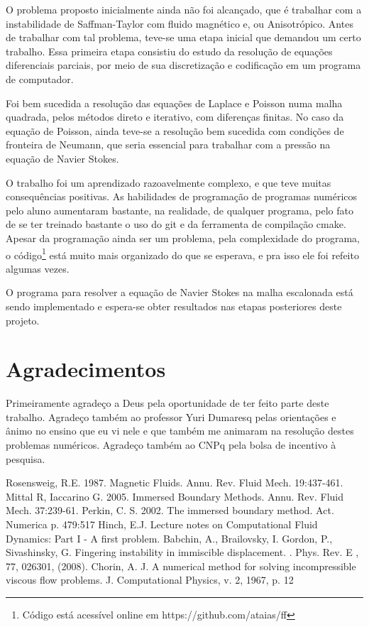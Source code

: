 \documentclass[journal]{IEEEtran}
\begin{document}
O problema proposto inicialmente ainda não foi alcançado, que é trabalhar com a instabilidade de Saffman-Taylor com fluido magnético e, ou Anisotrópico. Antes de trabalhar com tal problema, teve-se uma etapa inicial que demandou um certo trabalho. Essa primeira etapa consistiu do estudo da resolução de equações diferenciais parciais, por meio de sua discretização e codificação em um programa de computador.

Foi bem sucedida a resolução das equações de Laplace e Poisson numa malha quadrada, pelos métodos direto e iterativo, com diferenças finitas. No caso da equação de Poisson, ainda teve-se a resolução bem sucedida com condições de fronteira de Neumann, que seria essencial para trabalhar com a pressão na equação de Navier Stokes.

O trabalho foi um aprendizado razoavelmente complexo, e que teve muitas consequências positivas. As habilidades de programação de programas numéricos pelo aluno aumentaram bastante, na realidade, de qualquer programa, pelo fato de se ter treinado bastante o uso do git e da ferramenta de compilação cmake. Apesar da programação ainda ser um problema, pela complexidade do programa, o código\footnote{Código está acessível online em https://github.com/ataias/ff} está muito mais organizado do que se esperava, e pra isso ele foi refeito algumas vezes.

O programa para resolver a equação de Navier Stokes na malha escalonada está sendo implementado e espera-se obter resultados nas etapas posteriores deste projeto.

\section*{Agradecimentos}

Primeiramente agradeço a Deus pela oportunidade de ter feito parte deste trabalho. Agradeço também ao professor Yuri Dumaresq pelas orientações e ânimo no ensino que eu vi nele e que também me animaram na resolução destes problemas numéricos. Agradeço também ao CNPq pela bolsa de incentivo à pesquisa.

\begin{thebibliography}{4}
 Rosensweig, R.E. 1987. Magnetic Fluids. Annu. Rev. Fluid Mech. 19:437-461.
 Mittal R, Iaccarino G. 2005. Immersed Boundary Methods. Annu. Rev. Fluid Mech. 37:239-61.
 Perkin, C. S. 2002. The immersed boundary method. Act. Numerica p. 479:517
 Hinch, E.J. Lecture notes on Computational Fluid Dynamics: Part I - A first problem. 
 Babchin, A., Brailovsky, I. Gordon, P., Sivashinsky, G. Fingering instability in immiscible displacement. . Phys. Rev. E , 77, 026301, (2008).
 Chorin, A. J. A numerical method for solving incompressible viscous flow problems. J. Computational Physics, v. 2, 1967, p. 12
\end{thebibliography}
\end{document}
